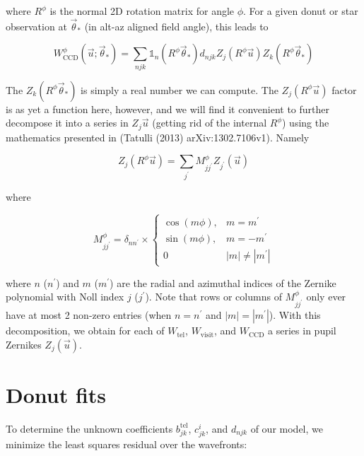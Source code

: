 \documentclass{article}
\begin{document}
where $R^\phi$ is the normal 2D rotation matrix for angle $\phi$.  For a given
donut or star observation at $\vec{\theta}_\ast$ (in alt-az aligned field
angle), this leads to

\begin{equation}
    W^\phi_\mathrm{CCD}\left(\vec{u}; \vec{\theta}_\ast\right) =
    \sum_{njk} \mathbb{1}_n(R^\phi \vec{\theta}_\ast) d_{njk} Z_j(R^\phi \vec{u}) Z_k(R^\phi \vec{\theta}_\ast)
\end{equation}

The $Z_k(R^\phi \vec{\theta}_\ast)$ is simply a real number we can compute.  The
$Z_j(R^\phi \vec{u})$ factor is as yet a function here, however, and we will
find it convenient to further decompose it into a series in $Z_j{\vec{u}}$
(getting rid of the internal $R^\phi$) using the mathematics presented in
(Tatulli (2013) arXiv:1302.7106v1).  Namely

\begin{equation}
    Z_j(R^\phi \vec{u}) = \sum_{j^\prime} M_{j j^\prime}^\phi Z_{j^\prime}(\vec{u})
\end{equation}

where

\begin{equation}
    M_{j j^\prime}^\phi = \delta_{n n^\prime} \times \begin{cases}
    \cos(m \phi), & m = m^\prime \\
    \sin(m \phi), & m = -m^\prime \\
    0 & |m| \ne |m^\prime|
\end{cases}
\end{equation}

where $n$ ($n^\prime$) and $m$ ($m^\prime$) are the radial and azimuthal indices
of the Zernike polynomial with Noll index $j$ ($j^\prime$).  Note that rows or
columns of $M^\phi_{j j^\prime}$ only ever have at most 2 non-zero entries (when
$n = n^\prime$ and $|m| = |m^\prime|$).  With this decomposition, we obtain
for each of $W_\mathrm{tel}$, $W_\mathrm{visit}$, and $W_\mathrm{CCD}$ a series
in pupil Zernikes $Z_j(\vec{u})$.

\section{Donut fits}

To determine the unknown coefficients $b^\mathrm{tel}_{jk}$, $c^i_{jk}$, and
$d_{njk}$ of our model, we minimize the least squares residual over the
wavefronts:
\end{document}
